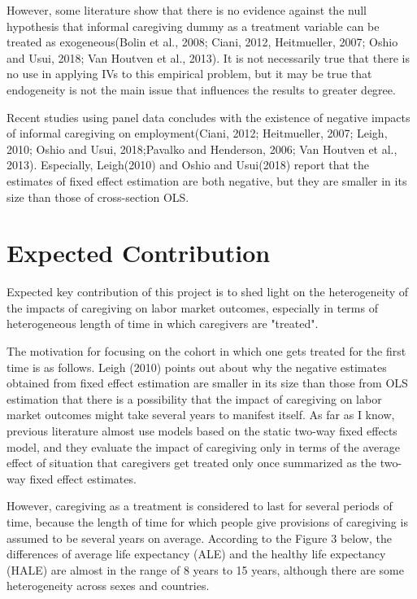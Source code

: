 \documentclass{article}
\theoremstyle{definition}
\begin{document}
However, some literature show that there is no evidence against the null hypothesis that informal caregiving dummy as a treatment variable can be treated as exogeneous(Bolin et al., 2008; Ciani, 2012, Heitmueller, 2007; Oshio and Usui, 2018; Van Houtven et al., 2013). It is not necessarily true that there is no use in applying IVs to this empirical problem, but it may be true that endogeneity is not the main issue that influences the results to greater degree.

Recent studies using panel data concludes with the existence of negative impacts of informal caregiving on employment(Ciani, 2012; Heitmueller, 2007; Leigh, 2010; Oshio and Usui, 2018;Pavalko and Henderson, 2006; Van Houtven et al., 2013). 
Especially, Leigh(2010) and Oshio and Usui(2018) report that the estimates of fixed effect estimation are both negative, but they are smaller in its size than those of cross-section OLS.

\section{Expected Contribution}

Expected key contribution of this project is to shed light on the heterogeneity of the impacts of caregiving on labor market outcomes, especially in terms of heterogeneous length of time  in which caregivers are "treated". 

The motivation for focusing on the cohort in which one gets treated for the first time is as follows. Leigh (2010) points out about why the negative estimates obtained from fixed effect estimation are smaller in its size than those from OLS estimation that there is a possibility that the impact of caregiving on labor market outcomes might take several years to manifest itself. As far as I know, previous literature almost use models based on the static two-way fixed effects model, and they evaluate the impact of caregiving only in terms of the average effect of situation that caregivers get treated only once summarized as the two-way fixed effect estimates.

However, caregiving as a treatment is considered to last for several periods of time, because the length of time for which people give provisions of caregiving is assumed to be several years on average. According to the Figure 3 below, the differences of average life expectancy (ALE) and the healthy life expectancy (HALE) are almost in the range of 8 years to 15 years, although there are some heterogeneity across sexes and countries. 
\end{document}
